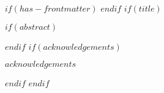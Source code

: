 $if(has-frontmatter)$
\frontmatter
$endif$
$if(title)$
\maketitle
{}
\setcounter{page}{2}
$if(abstract)$
\begin{abstract}
$abstract$
\end{abstract}
$endif$
$if(acknowledgements)$
\begin{acknowledgements}
$acknowledgements$
\end{acknowledgements}
$endif$
$endif$
